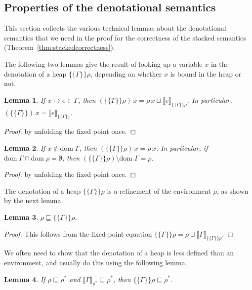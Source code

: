 \documentclass{jfp1}
\newtheorem{lemma}{Lemma}
\theoremstyle{nonumberbreak}
\newtheorem{proof}{Proof}
\newcommand{\dom}[1]{\text{dom}\;#1}
\newcommand{\dsem}[2]{\llbracket #1 \rrbracket_{#2}}
\newcommand{\esem}[1]{\{\!\!\!\{#1\}\!\!\!\}}
\begin{document}
\subsection{Properties of the denotational semantics}
\label{sec:denprops}

This section collects the various technical lemmas about the denotational semantics that we need in the proof for the correctness of the stacked semantics (Theorem~\ref{thm:stackedcorrectness}).

The following two lemmas give the result of looking up a variable $x$ in the denotation of a heap $\esem\Gamma\rho$, depending on whether $x$ is bound in the heap or not. 

\begin{lemma}
\label{lem:esem_this}
If $x \mapsto e \in \Gamma$, then $(\esem{\Gamma}\rho)\, x = \rho\, x \sqcup \dsem{e}{\esem{\Gamma}\rho}$. In particular, $(\esem{\Gamma})\, x = \dsem{e}{\esem{\Gamma}}$.
\end{lemma}

\begin{proof}
by unfolding the fixed point once.
\end{proof}

\begin{lemma}
\label{lem:esem_other}%
\label{lem:remove}
If $x \notin \dom \Gamma$, then $(\esem{\Gamma}\rho)\, x = \rho\, x$.
In particular, if $\dom \Gamma \cap \dom \rho = \emptyset$, then $(\esem{\Gamma}\rho) \setminus \dom\Gamma = \rho$.
\end{lemma}

\begin{proof}
by unfolding the fixed point once.
\end{proof}

The denotation of a heap $\esem\Gamma\rho$ is a refinement of the environment $\rho$, as shown by the next lemma.

\begin{lemma}
$\rho \sqsubseteq \esem{\Gamma}{\rho}$.
\label{lem:rho_below_esem}
\end{lemma}

\begin{proof}
This follows from the fixed-point equation $\esem{\Gamma}{\rho} = \rho \sqcup \dsem{\Gamma}{\esem{\Gamma}{\rho}}$.
\end{proof}

We often need to show that the denotation of a heap is less defined than an environment, and usually do this using the following lemma.
\begin{lemma}
If $\rho \sqsubseteq \rho^*$ and $\dsem{\Gamma}{\rho^*} \sqsubseteq \rho^*$, then $\esem{\Gamma}\rho \sqsubseteq \rho^*$.
\label{lem:esem_below}
\end{lemma}
\end{document}
